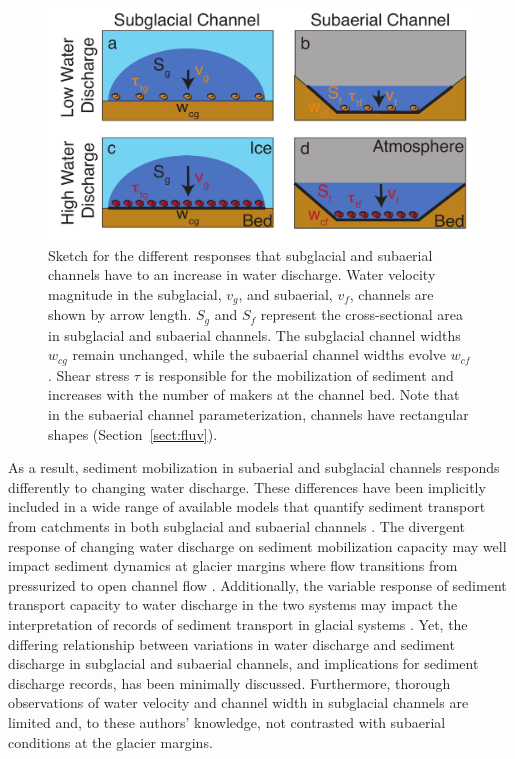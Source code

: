 \documentclass[11pt]{article}
\newcommand{\ian}[1]{{\textbf{\color{blue}Ian says:} \color{blue} #1} }
\begin{document}
  \begin{figure}[h]
  \centering
    \includegraphics[width=0.8\linewidth]{Fig1.pdf}
    \caption{Sketch for the different responses that subglacial and subaerial channels have to an increase in water discharge.  Water velocity magnitude in the subglacial, $v_g$, and subaerial, $v_f$, channels are shown by arrow length. $S_g$ and $S_f$ represent the cross-sectional area in subglacial and subaerial channels. The subglacial channel widths $w_{cg}$ remain unchanged, while the subaerial channel widths evolve $w_{cf}$. Shear stress $\tau$ is responsible for the mobilization of sediment and increases with the number of makers at the channel bed. 
      Note that in the subaerial channel parameterization, channels have rectangular shapes (Section~\ref{sect:fluv}).} 
    \label{fig:cartoon}
  \end{figure}


As a result, sediment mobilization in subaerial and subglacial channels responds differently to changing water discharge.
These differences have been implicitly included in a wide range of available models that  quantify sediment transport from catchments in both subglacial and subaerial channels  \citep[e.g.][]{walder1994,tucker1997,creyts2013,wickert2019,hewitt2019}.
The divergent response of changing water discharge on sediment mobilization capacity may well impact sediment dynamics at glacier margins where flow transitions from pressurized to open channel flow \citep[e.g.][]{lane2016,perolo2018}.
Additionally, the variable response of sediment transport capacity to water discharge in the two systems may impact the interpretation of records of sediment transport in glacial systems \citep[e.g.][]{muller1968,richards2003,swift2005,ganti2016}.
Yet, the differing relationship between variations in water discharge and sediment discharge in subglacial and subaerial channels, and implications for sediment discharge records, has been minimally discussed.
Furthermore, thorough observations of water velocity and channel width in subglacial channels are limited and, to these authors' knowledge, not contrasted with subaerial conditions at the glacier margins. 
\end{document}
